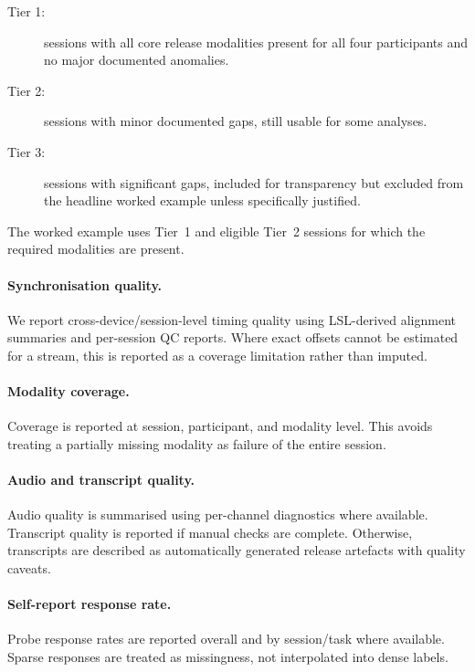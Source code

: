 \documentclass{article}
\begin{document}
\begin{description}
  \item[Tier 1:]
  sessions with all core release modalities present for all four participants
  and no major documented anomalies.
  \item[Tier 2:]
  sessions with minor documented gaps, still usable for some analyses.
  \item[Tier 3:]
  sessions with significant gaps, included for transparency but excluded from
  the headline worked example unless specifically justified.
\end{description}

The worked example uses Tier~1 and eligible Tier~2 sessions for which the
required modalities are present.



\paragraph{Synchronisation quality.}
We report cross-device/session-level timing quality using LSL-derived
alignment summaries and per-session QC reports.
Where exact offsets cannot be estimated for a stream, this is reported as a
coverage limitation rather than imputed.

\paragraph{Modality coverage.}
Coverage is reported at session, participant, and modality level.
This avoids treating a partially missing modality as failure of the entire
session.

\paragraph{Audio and transcript quality.}
Audio quality is summarised using per-channel diagnostics where available.
Transcript quality is reported if manual checks are complete.
Otherwise, transcripts are described as automatically generated release
artefacts with quality caveats.

\paragraph{Self-report response rate.}
Probe response rates are reported overall and by session/task where available.
Sparse responses are treated as missingness, not interpolated into dense labels.
\end{document}
